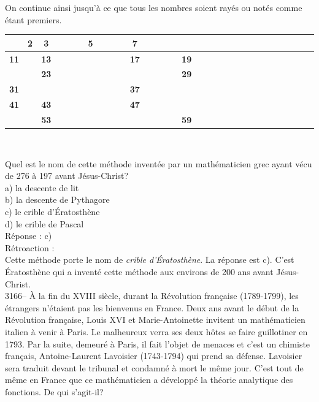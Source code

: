 \documentclass[letterpaper, 12pt]{article}
\begin{document}
On continue ainsi jusqu'\`a ce que tous les nombres soient ray\'es ou not\'es comme \'etant premiers.
\begin{center}
\begin{tabular}{|c|c|c|c|c|c|c|c|c|c|c|c|c|c|c|c|c|c|c|c|} \cline{2-10}
\multicolumn{1}{c|}{} & {\bf 2} & {\bf 3} & \ \ \ \ & {\bf 5} & \ \ \ \ & {\bf 7} & \ \ \ \ & \ \ \ \ & \ \ \ \ \\ \hline
{\bf 11} & & {\bf 13} & & & & {\bf 17} & & {\bf 19} & \\ \hline
& & {\bf 23} & & & & & & {\bf 29} &\\ \hline
{\bf 31} & & & & & & {\bf 37} & & &\\ \hline
{\bf 41} & & {\bf 43} & & & & {\bf 47} & & &\\ \hline
& & {\bf 53} & & & & & & {\bf 59} &\\ \hline
\end{tabular}\\
\end{center}

Quel est le nom de cette m\'ethode invent\'ee par un math\'ematicien grec ayant v\'ecu de 276 \`a 197 avant J\'esus-Christ?\\

a) la descente de lit\\
b) la descente de Pythagore\\
c) le crible d'\'Eratosth\`ene\\
d) le crible de Pascal\\

R\'eponse : c)\\

R\'etroaction :\\
Cette m\'ethode porte le nom de \emph{crible d'\'Eratosth\`ene}. La r\'eponse est c). C'est \'Eratosth\`ene qui a invent\'e cette m\'ethode aux environs de 200 ans avant J\'esus-Christ.\\



3166-- \`A la fin du {\scriptsize XVIII\ieme{}} si\`ecle, durant la R\'evolution fran\c caise (1789-1799), les \'etrangers n'\'etaient pas les bienvenus en France. Deux ans avant le d\'ebut de la R\'evolution fran\c caise, Louis XVI et Marie-Antoinette invitent un math\'ematicien italien \`a venir \`a Paris. Le malheureux verra ses deux h\^otes se faire guillotiner en 1793. Par la suite, demeur\'e \`a Paris, il fait l'objet de menaces et c'est un chimiste fran\c cais, Antoine-Laurent Lavoisier (1743-1794) qui prend sa d\'efense. Lavoisier sera traduit devant le tribunal et condamn\'e \`a mort le m\^eme jour. C'est tout de m\^eme en France que ce math\'ematicien a d\'evelopp\'e la th\'eorie analytique des fonctions. De qui s'agit-il?\\
\end{document}
